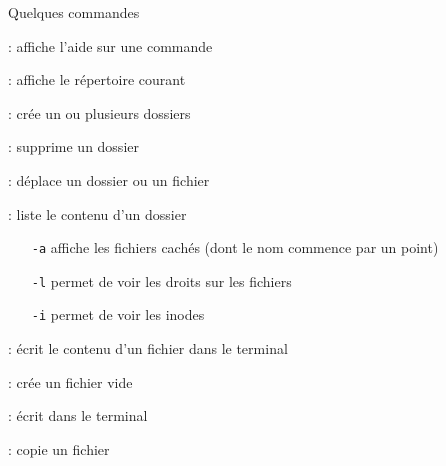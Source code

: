 \documentclass[10pt]{beamer}
\begin{document}
\begin{frame}{\Ctitle}{\stitle}
	\begin{block}{Quelques commandes}
		\begin{description}
			\item<1->[\textcolor{blue}{\tt man}] : affiche l'aide sur une commande
			\item<2->[\textcolor{blue}{\tt pwd}] : affiche le répertoire courant
			\item<3->[\textcolor{blue}{\tt mkdir}] : crée un ou plusieurs dossiers
			\item<4->[\textcolor{blue}{\tt rmdir}] : supprime un dossier
			\item<5->[\textcolor{blue}{\tt mv}] : déplace un dossier ou un fichier
			\item<6->[\textcolor{blue}{\tt ls}] : liste le contenu d'un dossier
				{\footnotesize \begin{itemize}
						\item[{\tt -a}] affiche les fichiers cachés (dont le nom commence par un point)
						\item[{\tt -l}] permet de voir les droits sur les fichiers
						\item[{\tt -i}] permet de voir les inodes
					\end{itemize}}
			\item<7->[\textcolor{blue}{\tt cat}] : écrit le contenu d'un fichier dans le terminal
			\item<8->[\textcolor{blue}{\tt touch}] : crée un fichier vide
			\item<9->[\textcolor{blue}{\tt echo}] : écrit dans le terminal
			\item<10->[\textcolor{blue}{\tt cp}] : copie un fichier
		\end{description}
	\end{block}
\end{frame}
\end{document}
